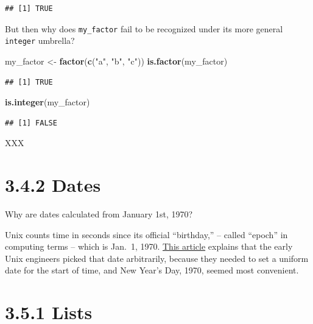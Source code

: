 \documentclass[]{book}
\newenvironment{Shaded}{\begin{snugshade}}{\end{snugshade}}
\newcommand{\KeywordTok}[1]{\textcolor[rgb]{0.13,0.29,0.53}{\textbf{#1}}}
\newcommand{\NormalTok}[1]{#1}
\newcommand{\StringTok}[1]{\textcolor[rgb]{0.31,0.60,0.02}{#1}}
\begin{document}
\begin{verbatim}
## [1] TRUE
\end{verbatim}

But then why does \texttt{my\_factor} fail to be recognized under its more general \texttt{integer} umbrella?

\begin{Shaded}
\begin{Highlighting}[]
\NormalTok{my_factor <-}\StringTok{ }\KeywordTok{factor}\NormalTok{(}\KeywordTok{c}\NormalTok{(}\StringTok{"a"}\NormalTok{, }\StringTok{"b"}\NormalTok{, }\StringTok{"c"}\NormalTok{))}
\KeywordTok{is.factor}\NormalTok{(my_factor)}
\end{Highlighting}
\end{Shaded}

\begin{verbatim}
## [1] TRUE
\end{verbatim}

\begin{Shaded}
\begin{Highlighting}[]
\KeywordTok{is.integer}\NormalTok{(my_factor)}
\end{Highlighting}
\end{Shaded}

\begin{verbatim}
## [1] FALSE
\end{verbatim}

XXX

\hypertarget{dates}{%
\section*{3.4.2 Dates}\label{dates}}

Why are dates calculated from January 1st, 1970?

Unix counts time in seconds since its official ``birthday,'' -- called ``epoch'' in computing terms -- which is Jan.~1, 1970. \href{https://www.wired.com/2001/09/unix-tick-tocks-to-a-billion/}{This article} explains that the early Unix engineers picked that date arbitrarily, because they needed to set a uniform date for the start of time, and New Year's Day, 1970, seemed most convenient.

\hypertarget{lists}{%
\section*{3.5.1 Lists}\label{lists}}
\end{document}
